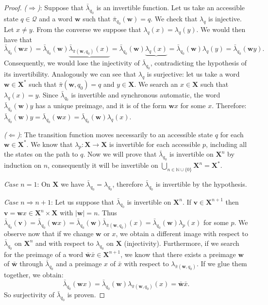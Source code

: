 \documentclass[mat1]{fmfdeloTS2.0}
\newcommand{\N}{\mathbb N}
\newcommand{\word}{\mathbf}				%
\newcommand{\abece}{\mathbf{X}}			%
\newcommand{\fslovar}{\mathbf{X^*}}		%
\newcommand{\QQ}{\mathcal{Q}}			%
\newcommand{\PI}{\bar{\pi}}			%
\newcommand{\LAMBDA}{\bar{\lambda}}			%
\begin{document}
\begin{proof}
\emph{($\Rightarrow$)}: Suppose that $\LAMBDA_{q_0}$ is an invertible function. Let us take an accessible state $q\in\QQ$ and a word $\word{w}$ such that $\PI_{q_0}(\word{w})=q$. We check that $\lambda_q$ is injective. Let $x\neq y$. From the converse we suppose that $\lambda_q(x)=\lambda_q(y)$. We would then have that 
$$\LAMBDA_{q_0}(\word{w}x)=\LAMBDA_{q_0}(\word{w})\underbrace{\LAMBDA_{\PI(\word{w},q_0)}(x)}=\LAMBDA_{q_0}(\word{w})\underbrace{\lambda_{q}(x)}=\LAMBDA_{q_0}(\word{w})\lambda_{q}(y)=\LAMBDA_{q_0}(\word{w}y).$$
Consequently, we would lose the injectivity of $\LAMBDA_{q_0}$, contradicting the hypothesis of its invertibility. Analogously we can see that $\lambda_q$ is surjective: let us take a word $\word{w}\in\fslovar$ such that $\PI(\word{w},q_0)=q$ and $y\in\abece$. We search an $x\in\abece$ such that $\lambda_q(x)=y$. Since $\LAMBDA_{q_0}$ is invertible and synchronous automatic, the word $\LAMBDA_{q_0}(\word{w})y$ has a unique preimage, and it is of the form $\word{w}x$ for some $x$. Therefore: $\LAMBDA_{q_0}(\word{w})y=\LAMBDA_{q_0}(\word{w}x)=\LAMBDA_{q_0}(\word{w})\lambda_q(x)$.

\emph{($\Leftarrow$)}: The transition function moves necessarily to an accessible state $q$ for each $\word{w}\in\fslovar$. We know that $\lambda_p:\abece\longrightarrow\abece$ is invertible for each accessible $p$, including all the states on the path to $q$. 
Now we will prove that $\LAMBDA_{q_0}$ is invertible on $\abece^n$ by induction on $n$, consequently it will be invertible on $\bigcup_{n\in\N\cup\{0\}} \abece^n=\fslovar$.

\emph{Case $n=1$}: On $\abece$ we have $\LAMBDA_{q_0}=\lambda_{q_0}$, therefore $\LAMBDA_{q_0}$ is invertible by the hypothesis.

\emph{Case $n\Rightarrow n+1$}: Let us suppose that $\LAMBDA_{q_0}$ is invertible on $\abece^n$. If $\word{v}\in\abece^{n+1}$ then $\word{v}=\word{w}x\in\abece^n\times\abece$ with $|\word{w}|=n$. Thus $\LAMBDA_{q_0}(\word{v})=\LAMBDA_{q_0}(\word{w}x)=\LAMBDA_{q_0}(\word{w})\LAMBDA_{\PI(\word{w},q_0)}(x)=\LAMBDA_{q_0}(\word{w})\lambda_p(x)$ for some $p$. 
We observe now that if we change $\word{w}$ or $x$, we obtain a different image with respect to $\LAMBDA_{q_0}$ on $\abece^n$ and with respect to $\lambda_{q_0}$ on $\abece$ (injectivity). Furthermore, if we search for the preimage of a word $\word{\bar{w}}\bar{x}\in\abece^{n+1}$, we know that there exists a preimage $\word{w}$ of $\word{\bar{w}}$ through $\LAMBDA_{q_0}$ and a preimage $x$ of $\bar{x}$ with respect to $\lambda_{\PI(\word{w},q_0)}$. If we glue them together, we obtain:
$$\LAMBDA_{q_0}(\word{w}x)=\LAMBDA_{q_0}(\word{w})\lambda_{\PI(\word{w},q_0)}(x)=\word{\bar{w}}\bar{x}.$$
So surjectivity of $\LAMBDA_{q_0}$ is proven.
\end{proof}
\end{document}
